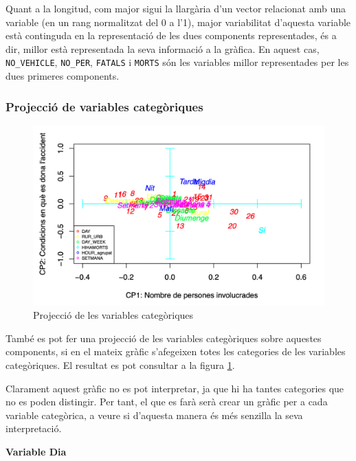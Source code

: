 \documentclass[12pt,longbibliography]{article}
\theoremstyle{definition}
\theoremstyle{remark}
\begin{document}
Quant a la longitud, com major sigui la llargària d'un vector relacionat amb una variable (en un rang normalitzat del 0 a l'1), major variabilitat d'aquesta variable està continguda en la representació de les dues components representades, és a dir, millor està representada la seva informació a la gràfica. En aquest cas, \texttt{NO\_VEHICLE}, \texttt{NO\_PER}, \texttt{FATALS} i \texttt{MORTS} són les variables millor representades per les dues primeres components.


\subsubsection{Projecció de variables categòriques}




\begin{figure}[H]
\begin{center}
\includegraphics[width=12cm]{acp6}
\end{center}
\caption{Projecció de les variables categòriques}
\label{fig:ACP6}
\end{figure}

També es pot fer una projecció de les variables categòriques sobre aquestes components, si en el mateix gràfic s'afegeixen totes les categories de les variables categòriques. El resultat es pot consultar a la figura \ref{fig:ACP6}.

Clarament aquest gràfic no es pot interpretar, ja que hi ha tantes categories que no es poden distingir.
Per tant, el que es farà serà crear un gràfic per a cada variable categòrica, a veure si d'aquesta manera és més senzilla la seva interpretació.



\textbf{Variable Dia}
\end{document}
